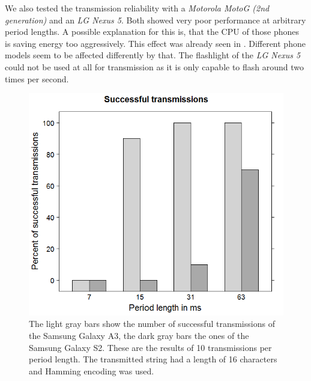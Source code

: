 \documentclass{ewsn-proc} %
\begin{document}
We also tested the transmission reliability with a \textit{Motorola MotoG (2nd generation)} and an \textit{LG Nexus 5}.
Both showed very poor performance at arbitrary period lengths.
A possible explanation for this is, that the CPU of those phones is saving energy too aggressively.
This effect was already seen in \cite{mongia2010reliable}.
Different phone models seem to be affected differently by that.
The flashlight of the \textit{LG Nexus 5} could not be used at all for transmission as it is only capable to flash around two times per second.

\begin{figure}
	\centering
	\includegraphics[scale=.35]{images/successful-transmissions.png}
	\caption{The light gray bars show the number of successful transmissions of the Samsung Galaxy A3, the dark gray bars the ones of the Samsung Galaxy S2. These are the results of 10 transmissions per period length. The transmitted string had a length of 16 characters and Hamming encoding was used.}
	\label{fig:successful_transmissions}
\end{figure}
\end{document}
